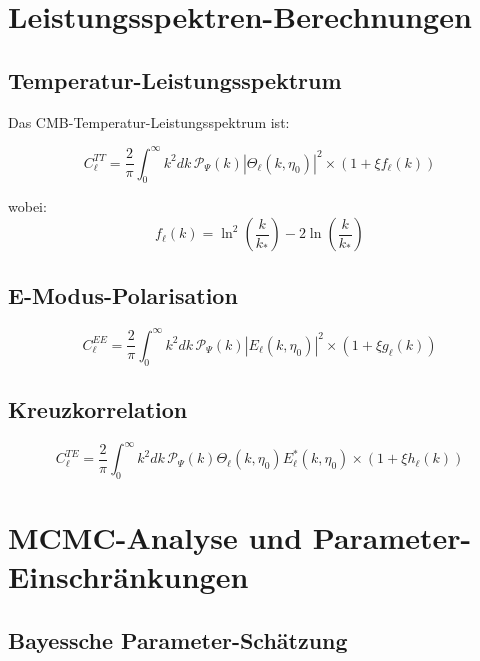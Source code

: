 \documentclass[12pt,a4paper]{article}
\newcommand{\xipar}{\xi}
\theoremstyle{definition}
\theoremstyle{remark}
\begin{document}
	\section{Leistungsspektren-Berechnungen}
	\label{sec:power_spectra}
	
	\subsection{Temperatur-Leistungsspektrum}
	
	Das CMB-Temperatur-Leistungsspektrum ist:
	
	\begin{equation}
		C_\ell^{TT} = \frac{2}{\pi}\int_0^\infty k^2 dk \, \mathcal{P}_\Psi(k) |\Theta_\ell(k,\eta_0)|^2 \times \left(1 + \xipar f_\ell(k)\right)
		\label{eq:cl_tt}
	\end{equation}
	
	wobei:
	\begin{equation}
		f_\ell(k) = \ln^2\left(\frac{k}{k_*}\right) - 2\ln\left(\frac{k}{k_*}\right)
	\end{equation}
	
	\subsection{E-Modus-Polarisation}
	
	\begin{equation}
		C_\ell^{EE} = \frac{2}{\pi}\int_0^\infty k^2 dk \, \mathcal{P}_\Psi(k) |E_\ell(k,\eta_0)|^2 \times \left(1 + \xipar g_\ell(k)\right)
	\end{equation}
	
	\subsection{Kreuzkorrelation}
	
	\begin{equation}
		C_\ell^{TE} = \frac{2}{\pi}\int_0^\infty k^2 dk \, \mathcal{P}_\Psi(k) \Theta_\ell(k,\eta_0) E_\ell^*(k,\eta_0) \times \left(1 + \xipar h_\ell(k)\right)
	\end{equation}
	
	\section{MCMC-Analyse und Parameter-Einschr\"ankungen}
	\label{sec:mcmc}
	
	\subsection{Bayessche Parameter-Sch\"atzung}
	
\end{document}
